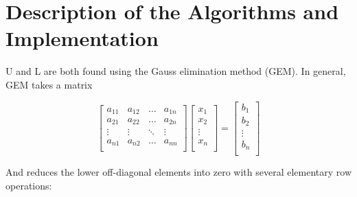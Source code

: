 \documentclass[12pt, letterpaper]{article}
\begin{document}
\section{Description of the Algorithms and Implementation}

U and L are both found using the Gauss elimination method (GEM). In general, GEM takes a matrix

\[
\begin{bmatrix}
    a_{11} & a_{12} & \ldots & a_{1n} \\
    a_{21} & a_{22} & \ldots & a_{2n} \\
    \vdots & \vdots & \ddots & \vdots \\
    a_{n1} & a_{n2} & \ldots & a_{nn} \\
\end{bmatrix}
\begin{bmatrix}
    x_1 \\
    x_2 \\
    \vdots \\
    x_n \\
\end{bmatrix}
=
\begin{bmatrix}
    b_1 \\
    b_2 \\
    \vdots \\
    b_n \\
\end{bmatrix}
\]

And reduces the lower off-diagonal elements into zero with several elementary row operations:
\end{document}
